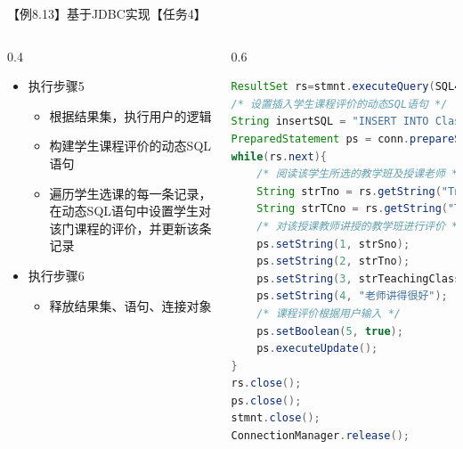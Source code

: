 \begin{frame}{【例8.13】基于JDBC实现【任务4】}
\begin{columns}
\begin{column}{0.4\textwidth}
\vspace{-2ex}
\begin{itemize}
    \item 执行步骤5
    \begin{itemize}
        \item 根据结果集，执行用户的逻辑
        \item 构建学生课程评价的动态SQL语句
        \item 遍历学生选课的每一条记录，在动态SQL语句中设置学生对该门课程的评价，并更新该条记录
    \end{itemize}
    \item 执行步骤6
    \begin{itemize}
        \item 释放结果集、语句、连接对象
    \end{itemize}
\end{itemize}
\end{column}

\begin{column}{0.6\textwidth}
\vspace{-4ex}
\begin{block}{}
\begin{lstlisting}[language=Java, linewidth=\textwidth, basicstyle=\ttfamily\tiny]
ResultSet rs=stmnt.executeQuery(SQL4ClassAssess);
/* 设置插入学生课程评价的动态SQL语句 */
String insertSQL = "INSERT INTO ClassAssess(Sno, Tno, TCno, Assess, CAtype) VALUES(?,?,?,?,?)";
PreparedStatement ps = conn.prepareStatement(insertSQL);
while(rs.next){
    /* 阅读该学生所选的教学班及授课老师 */
    String strTno = rs.getString("Tno");
    String strTCno = rs.getString("TeachingClassNo");
    /* 对该授课教师讲授的教学班进行评价 */
    ps.setString(1, strSno);
    ps.setString(2, strTno);
    ps.setString(3, strTeachingClassNo);
    ps.setString(4, "老师讲得很好");
    /* 课程评价根据用户输入 */
    ps.setBoolean(5, true);
    ps.executeUpdate();
}
rs.close();
ps.close();
stmnt.close();
ConnectionManager.release();
\end{lstlisting}
\end{block}
\end{column}

\end{columns}
\end{frame}
